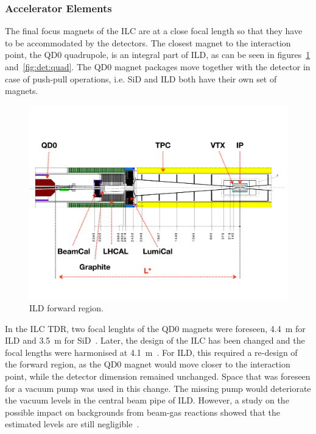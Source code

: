 \subsubsection{Accelerator Elements}
The final focus magnets of the ILC are at a close focal length so that they have to be accommodated by the detectors. The closest magnet to the interaction point, the QD0 quadrupole, is an integral part of ILD, as can be seen in figures~\ref{ild:fig:Forward_QD0} and~\ref{fig:det:quad}. The QD0 magnet packages move together with the detector in case of push-pull operations, i.e. SiD and ILD both have their own set of magnets.
\begin{figure}[h!]
\centering
\includegraphics[width=0.8\hsize]{ILC/figs/ILD_Forward_Region.pdf}
\caption{\label{ild:fig:Forward_QD0}ILD forward region.}
\end{figure}
In the ILC TDR, two focal lenghts of the QD0 magnets were foreseen, 4.4~m for ILD and 3.5~m for SiD~\cite{Behnke:2013xla}. Later, the design of the ILC has been changed and the focal lengths were harmonised at 4.1~m~\cite{ild:bib:lstar_cr}. For ILD, this required a re-design of the forward region, as the QD0 magnet would move closer to the interaction point, while the detector dimension remained unchanged. Space that was foreseen for a vacuum pump was used in this change. The missing pump would deteriorate the vacuum levels in the central beam pipe of ILD. However, a study on the possible impact on backgrounds from beam-gas reactions showed that the estimated levels are still negligible~\cite{ild:bib:beam_gas}.

